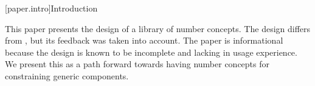 

[paper.intro]{Introduction}

\pnum
This paper presents the design of a library of number concepts.
The design differs from , but its feedback was taken into account.
The paper is informational because the design is known to be incomplete and lacking in usage experience.
We present this as a path forward towards having number concepts for constraining generic components.
\wheredevelisat
